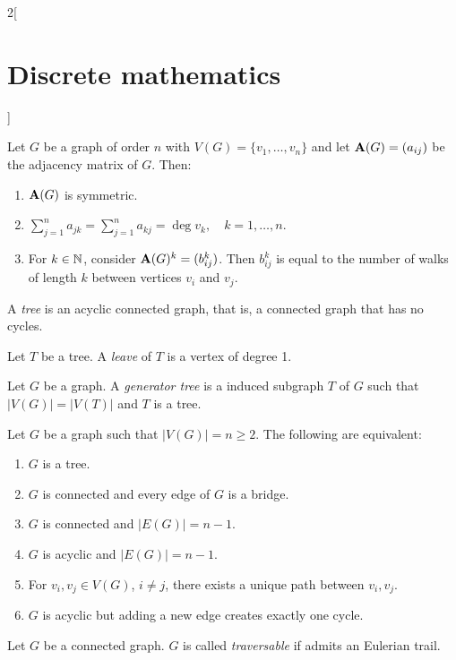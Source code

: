 \documentclass[../../../main.tex]{subfiles}
\begin{document}
\begin{multicols}{2}[\section{Discrete mathematics}]
\begin{definition}
    \end{definition}
    \begin{prop}
        Let $G$ be a graph of order $n$ with $V(G)=\{v_1,\ldots,v_n\}$ and let $\vb{A}(G)=(a_{ij})$ be the adjacency matrix of $G$. Then:
        \begin{enumerate}
            \item $\vb{A}(G)$ is symmetric.
            \item $\displaystyle\sum_{j=1}^n a_{jk}=\sum_{j=1}^n a_{kj}=\deg v_k,\quad k=1,\ldots,n$.
            \item For $k\in\mathbb{N} $, consider $\vb{A}(G)^k=(b_{ij}^k)$. Then $b_{ij}^k$ is equal to the number of walks of length $k$ between vertices $v_i$ and $v_j$.
        \end{enumerate}
    \end{prop}
    \begin{definition}
        A \textit{tree} is an acyclic connected graph, that is, a connected graph that has no cycles.
    \end{definition}
    \begin{definition}
        Let $T$ be a tree. A \textit{leave} of $T$ is a vertex of degree 1.
    \end{definition}
    \begin{definition}
        Let $G$ be a graph. A \textit{generator tree} is a induced subgraph $T$ of $G$ such that $|V(G)|=|V(T)|$ and $T$ is a tree.
    \end{definition}
    \begin{prop}
        Let $G$ be a graph such that $|V(G)|=n\geq 2$. The following are equivalent:
        \begin{enumerate}
            \item $G$ is a tree.
            \item $G$ is connected and every edge of $G$ is a bridge.
            \item $G$ is connected and $|E(G)|=n-1$.
            \item $G$ is acyclic and $|E(G)|=n-1$.
            \item For $v_i,v_j\in V(G)$, $i\ne j$, there exists a unique path between $v_i,v_j$.
            \item $G$ is acyclic but adding a new edge creates exactly one cycle.
        \end{enumerate}
    \end{prop}
    \begin{definition}
        Let $G$ be a connected graph. $G$ is called \textit{traversable} if admits an Eulerian trail.

\end{definition}
\end{multicols}
\end{document}
